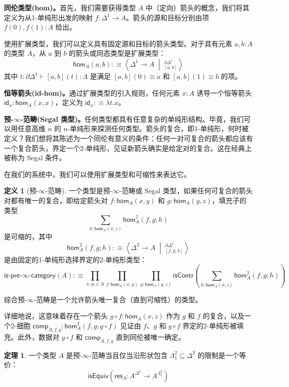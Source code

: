\documentclass[12pt,a4paper]{article}
\theoremstyle{definition}
\newtheorem{definition}{定义}[section]
\newtheorem{theorem}{定理}[section]
\theoremstyle{definition}
\begin{document}
\textbf{同伦类型(hom)。}首先，我们需要获得类型 $A$ 中（定向）箭头的概念，我们将其定义为从1-单纯形出发的映射 $f:\Delta^1 \to A$。箭头的源和目标分别由项 $f(0), f(1):A$ 给出。

使用扩展类型，我们可以定义具有固定源和目标的箭头类型。对于具有元素 $a,b:A$ 的类型 $A$，从 $a$ 到 $b$ 的箭头或同态类型是扩展类型：
\[
\mathsf{hom}_A(a,b) :\equiv \left\langle \Delta^1 \to A \; \middle| \; _{[a,b]}^{\partial\Delta^1} \right\rangle
\]
其中 $t:\partial\Delta^1 \vdash [a,b](t):A$ 是满足 $[a,b](0) \equiv a$ 和 $[a,b](1) \equiv b$ 的项。

\textbf{恒等箭头(id-hom)。}通过扩展类型的引入规则，任何元素 $x:A$ 诱导一个恒等箭头 $\mathsf{id}_x:\mathsf{hom}_A(x,x)$，定义为 $\mathsf{id}_x :\equiv \lambda t.x$。

\textbf{预-$\infty$-范畴(Segal 类型)。}任何类型都具有任意复杂的单纯形结构。毕竟，我们可以用任意高维 $n$ 的 $n$-单纯形来探测任何类型。箭头的复合，即1-单纯形，何时被定义？我们想将其陈述为一个同伦有意义的条件：任何一对可复合的箭头都应该有一个复合箭头，界定一个2-单纯形，见证新箭头确实是给定对的复合。这在经典上被称为 Segal 条件。

在我们的系统中，我们可以使用扩展类型和可缩性来表达它。

\begin{definition}[预-$\infty$-范畴]
一个类型是预-$\infty$-范畴或 Segal 类型，如果任何可复合的箭头对都有唯一的复合，即给定箭头对 $f:\mathsf{hom}_A(x,y)$ 和 $g:\mathsf{hom}_A(y,z)$，填充子的类型
\[
\sum_{h:\mathsf{hom}_A(x,z)} \mathsf{hom}_A^2(f,g;h)
\]
是可缩的，其中
\[
\mathsf{hom}_A^2(f,g;h) :\equiv \left\langle \Delta^2 \to A \; \middle| \; _{[f,g;h]}^{\partial\Delta^2} \right\rangle
\]
是由固定的1-单纯形选择界定的2-单纯形类型：
\[
\mathsf{is\text{-}pre\text{-}\infty\text{-}category}(A) :\equiv \prod_{x,y,z:A} \prod_{f:\mathsf{hom}_A(x,y)} \prod_{g:\mathsf{hom}_A(y,z)} \mathsf{isContr}\left(\sum_{h:\mathsf{hom}_A(x,z)} \mathsf{hom}_A^2(f,g;h)\right)
\]
\end{definition}

综合预-$\infty$-范畴是一个允许箭头唯一复合（直到可缩性）的类型。

详细地说，这意味着存在一个箭头 $g \circ f:\mathsf{hom}_A(x,z)$ 作为 $g$ 和 $f$ 的复合，以及一个2-细胞 $\mathsf{comp}_{A,f,g}:\mathsf{hom}_A^2(f,g;g \circ f)$ 见证由 $f$、$g$ 和 $g \circ f$ 界定的2-单纯形被填充。此外，数据对 $g \circ f$ 和 $\mathsf{comp}_{A,f,g}$ 直到同伦被唯一确定。

\begin{theorem}
一个类型 $A$ 是预-$\infty$-范畴当且仅当沿形状包含 $\Lambda_1^2 \subseteq \Delta^2$ 的限制是一个等价：
\[
\mathsf{isEquiv}\left(\mathsf{res}_A : A^{\Delta^2} \to A^{\Lambda_1^2}\right)
\]
\end{theorem}
\end{document}
